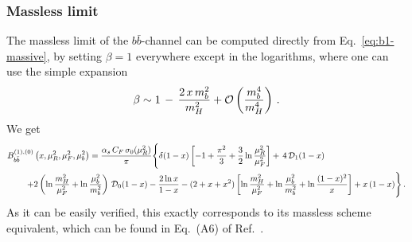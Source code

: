 \subsubsection{Massless limit}
The massless limit of the $b\bar{b}$-channel can be computed directly
from Eq.~\eqref{eq:b1-massive},
by setting $\beta=1$ everywhere except in the logarithms, where
one can use the simple expansion
\begin{equation}
  \label{eq:beta}
  \beta \sim 1\,-\,\frac{2\,x\,m_b^2}{m_H^2} + {\cal O}\left( \frac{m_b^4}{m_H^4} \right)\,.
\end{equation}
We get
\begin{equation}
  \label{eq:b1-massless}
  \begin{split}
    B_{b\bar{b}}^{(1),(0)}&\left(x,\mu_R^2,\mu_F^2,\mu_b^2 \right) = 
    \frac{\alpha_s \, C_F\,\sigma_0(\mu_R^2)}{\pi}
    \Biggl\{
      \delta(1-x)\left[ -1+ \frac{\pi^2}{3} + \frac{3}{2}
          \ln\frac{\mu_R^2}{\mu_F^2} \right] +\,4\,{\cal
        D}_1(1-x) \\
      +&  2\left( 
      \ln{\frac{m_H^2}{\mu_F^2}}+ \ln{\frac{\mu_b^2}{m_b^2}}\right)\,{\cal D}_0(1-x)
      -\frac{2\ln x}{1-x} - (2 + x + x^2)\left[
        \ln\frac{m_H^2}{\mu_F^2} +\ln{\frac{\mu_b^2}{m_b^2}} + \ln \frac{(1-x)^2}{x}\right]+ x\,(1-x)  \Biggr\}\,.
  \end{split} 
\end{equation}
As it can be easily verified, this exactly corresponds to its massless
scheme equivalent, which can be found in Eq.~(A6) of Ref.~\cite{Harlander:2003ai}.
